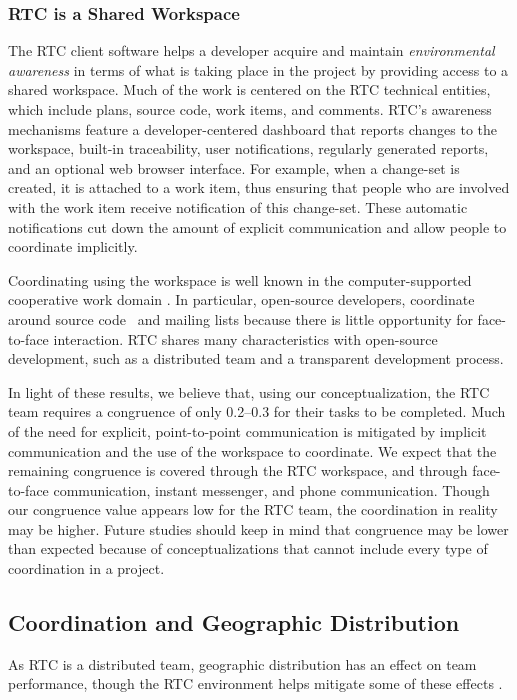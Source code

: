 \subsubsection{RTC is a Shared Workspace}
The RTC client software helps a developer acquire and maintain \emph{environmental awareness} in terms of what is taking place in the project by providing access to a shared workspace. Much of the work is centered on the RTC technical entities, which include plans, source code, work items, and comments.
RTC's awareness mechanisms feature a developer-centered dashboard that reports changes to the workspace, built-in traceability, user notifications, regularly generated reports, and an optional web browser interface. For example, when a change-set is created, it is attached to a work item, thus ensuring that people who are involved with the work item receive notification of this change-set. These automatic notifications cut down the amount of explicit communication and allow people to coordinate implicitly.

Coordinating using the workspace is well known in the computer-supported cooperative work domain \cite{schmidt1996}. In particular, open-source developers, coordinate around source code~\cite{bolici:stc:2009} and mailing lists \cite{gutwin2004:awareness,mockus2002:opensource} because there is little opportunity for face-to-face interaction. RTC shares many characteristics with open-source development, such as a distributed team and a transparent development process.

In light of these results, we believe that, using our conceptualization, the RTC team requires a congruence of only 0.2--0.3 for their tasks to be completed.
Much of the need for explicit, point-to-point communication is mitigated by implicit communication and the use of the workspace to coordinate.
We expect that the remaining congruence is covered through the RTC workspace, and through face-to-face communication, instant messenger, and phone communication. Though our congruence value appears low for the RTC team, the coordination in reality may be higher. Future studies should keep in mind that congruence may be lower than expected because of conceptualizations that cannot include every type of coordination in a project.

\subsection{Coordination and Geographic Distribution}
As RTC is a distributed team, geographic distribution has an effect on team performance, though the RTC environment helps mitigate some of these effects \cite{Nguyen:2008Distance}.


